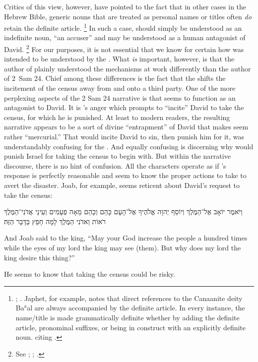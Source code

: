  Critics of this view, however, have pointed to the fact that in other cases in the Hebrew Bible, generic nouns that are treated as personal names or titles often \emph{do} retain the definite article.%
    \footnote{\Cite[114--117]{japhet2009};
        \cite[370--390]{japhet1993}. Japhet, for example, notes that direct references to the Canaanite deity Baʿal are always accompanied by the definite article. In every instance, the name/title  is made grammatically definite whether by adding the definite article, pronominal suffixes, or being in construct with an explicitly definite noun. 
        \cite[115]{japhet2009} citing 
        \cite[§126d]{gkc}.}
In such a case,  should simply be understood as an indefinite noun, ``an accuser'' and may be understood as a human antagonist of David.%
    \footnote{See 
        \cite{stokes_jbl2009};
        \cite[114--117]{japhet2009}; 
        \cite[370--390]{japhet1993}.} 
For our purposes, it is not essential that we know for certain how  was intended to be understood by the \chronicler. What \emph{is} important, however, is that the author of \chronicles plainly understood the mechanisms at work differently than the author of 2~Sam 24. Chief among these differences is the fact that the \chronicler shifts the incitement of the census away from \yahweh and onto a third party. One of the more perplexing aspects of the 2 Sam 24 narrative is that \yahweh seems to function as an antagonist to David. It is \yahweh's anger which prompts \yahweh to ``incite'' David to take the census, for which he is punished. At least to modern readers, the resulting narrative appears to be a sort of divine ``entrapment'' of David that makes \yahweh seem rather ``mercurial.''%
    \autocite[4]{rollston_keith-stuckenbruck2016}
That \yahweh would incite David to sin, then punish him for it, was understandably confusing for the \chronicler. And equally confusing is discerning why \yahweh would punish Israel for taking the census to begin with. But within the narrative discourse, there is no hint of confusion. All the characters operate as if \yahweh's response is perfectly reasonable and seem to know the proper actions to take to avert the disaster. Joab, for example, seems reticent about David's request to take the census:
\begin{hebrewtext}
    וַיֹּאמֶר יוֹאָב אֶל־הַמֶּלֶךְ וְיוֹסֵף יְהוָה אֱלֹהֶיךָ אֶל־הָעָם כָּהֵם וְכָהֵם מֵאָה פְעָמִים וְעֵינֵי אֲדֹנִי־הַמֶּלֶךְ רֹאוֹת וַאדֹנִי הַמֶּלֶךְ לָמָּה חָפֵץ בַּדָּבָר הַזֶּה׃
\end{hebrewtext}
\begin{translation}
    And Joab said to the king, ``May \yahweh your God increase the people a hundred times while the eyes of my lord the king may see (them). But why does my lord the king desire this thing?''
\end{translation}
\noindent
He seems to know that taking the census could be risky. 

